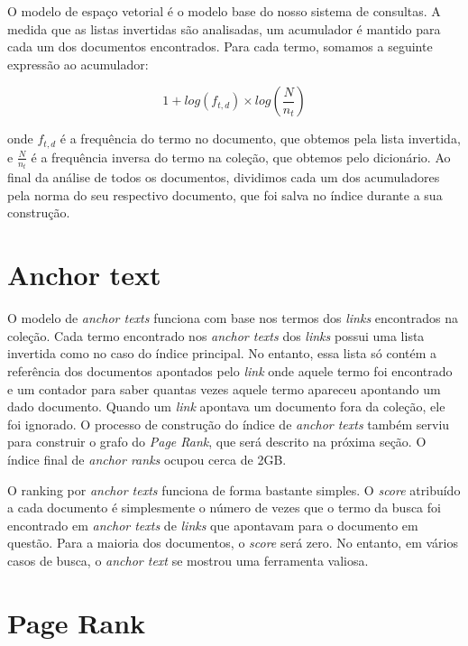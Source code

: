\documentclass{article}
\begin{document}
O modelo de espaço vetorial é o modelo base do nosso sistema de consultas. A medida que as
listas invertidas são analisadas, um acumulador é mantido para cada um dos documentos 
encontrados. Para cada termo, somamos a seguinte expressão ao acumulador:

\[
1 + log(f_{t,d}) \times log(\frac{N}{n_t})
\]

onde $ f_{t,d} $ é a frequência do termo no documento, que obtemos pela lista invertida, e
$ \frac{N}{n_t} $ é a frequência inversa do termo na coleção, que obtemos pelo dicionário. Ao
final da análise de todos os documentos, dividimos cada um dos acumuladores pela norma do
seu respectivo documento, que foi salva no índice durante a sua construção.

\section{Anchor text}

O modelo de \textit{anchor texts} funciona com base nos termos dos \textit{links}
encontrados na coleção. Cada termo encontrado nos \textit{anchor texts} dos \textit{links}
possui uma lista invertida como no caso do índice principal. No entanto, essa lista só contém 
a referência dos documentos apontados pelo \textit{link} onde aquele termo foi encontrado e um
contador para saber quantas vezes aquele termo apareceu apontando um dado documento. Quando um
\textit{link} apontava um documento fora da coleção, ele foi ignorado. O processo de construção
do índice de \textit{anchor texts} também serviu para construir o grafo do \textit{ Page Rank}, que
será descrito na próxima seção. O índice final de \textit{anchor ranks} ocupou cerca de 2GB.

O ranking por \textit{anchor texts} funciona de forma bastante simples. O \textit{score} atribuído a
cada documento é simplesmente o número de vezes que o termo da busca foi encontrado em \textit{anchor texts}
de \textit{links} que apontavam para o documento em questão. Para a maioria dos documentos, o \textit{score}
será zero. No entanto, em vários casos de busca, o \textit{anchor text} se mostrou uma ferramenta valiosa.

\section{Page Rank}
\end{document}
